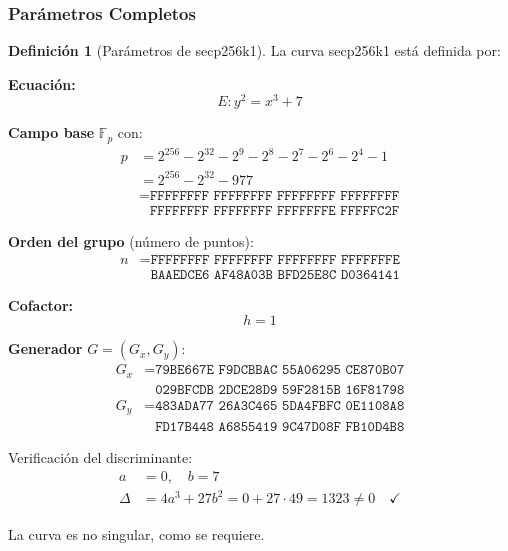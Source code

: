 \documentclass[11pt,a4paper,twoside,openright]{book}
\theoremstyle{definition}
\newtheorem{definition}{Definición}[chapter]
\theoremstyle{plain}
\theoremstyle{remark}
\newcommand{\Fp}{\mathbb{F}_p}
\begin{document}
\subsubsection{Parámetros Completos}

\begin{definition}[Parámetros de secp256k1]
La curva secp256k1 está definida por:

\textbf{Ecuación:}
\[ E: y^2 = x^3 + 7 \]

\textbf{Campo base} $\Fp$ con:
\begin{align}
p &= 2^{256} - 2^{32} - 2^9 - 2^8 - 2^7 - 2^6 - 2^4 - 1 \\
  &= 2^{256} - 2^{32} - 977 \\
  &= \texttt{FFFFFFFF FFFFFFFF FFFFFFFF FFFFFFFF} \\
  &\phantom{= }\texttt{FFFFFFFF FFFFFFFF FFFFFFFE FFFFFC2F}
\end{align}

\textbf{Orden del grupo} (número de puntos):
\begin{align}
n &= \texttt{FFFFFFFF FFFFFFFF FFFFFFFF FFFFFFFE} \\
  &\phantom{= }\texttt{BAAEDCE6 AF48A03B BFD25E8C D0364141}
\end{align}

\textbf{Cofactor:}
\[ h = 1 \]

\textbf{Generador} $G = (G_x, G_y)$:
\begin{align}
G_x &= \texttt{79BE667E F9DCBBAC 55A06295 CE870B07} \\
    &\phantom{= }\texttt{029BFCDB 2DCE28D9 59F2815B 16F81798} \\
G_y &= \texttt{483ADA77 26A3C465 5DA4FBFC 0E1108A8} \\
    &\phantom{= }\texttt{FD17B448 A6855419 9C47D08F FB10D4B8}
\end{align}
\end{definition}

\begin{mathnote}
Verificación del discriminante:
\begin{align}
a &= 0, \quad b = 7 \\
\Delta &= 4a^3 + 27b^2 = 0 + 27 \cdot 49 = 1323 \neq 0 \quad \checkmark
\end{align}

La curva es no singular, como se requiere.
\end{mathnote}

\end{document}
